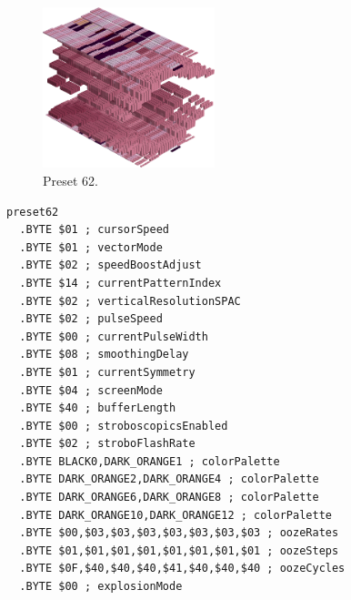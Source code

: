 \vspace*{-0.75cm}
\begin{minipage}[b]{0.48\linewidth}
\begin{figure}[H]                                                          
  \centering                                                             
  \begin{adjustbox}{width=5cm,center}                                   
  \includegraphics[width=5cm]{src/colorspace_presets/preset62-45.png}%
  \end{adjustbox}                                                        
\caption*{Preset 62.}                                           
\end{figure}                                                               
\end{minipage}
\hspace{0.1cm}
\begin{minipage}[b]{0.48\linewidth}                                                                         
\begin{lstlisting}[basicstyle=\ttfamily\tiny]
preset62
  .BYTE $01 ; cursorSpeed
  .BYTE $01 ; vectorMode
  .BYTE $02 ; speedBoostAdjust
  .BYTE $14 ; currentPatternIndex
  .BYTE $02 ; verticalResolutionSPAC
  .BYTE $02 ; pulseSpeed
  .BYTE $00 ; currentPulseWidth
  .BYTE $08 ; smoothingDelay
  .BYTE $01 ; currentSymmetry
  .BYTE $04 ; screenMode
  .BYTE $40 ; bufferLength
  .BYTE $00 ; stroboscopicsEnabled
  .BYTE $02 ; stroboFlashRate
  .BYTE BLACK0,DARK_ORANGE1 ; colorPalette
  .BYTE DARK_ORANGE2,DARK_ORANGE4 ; colorPalette
  .BYTE DARK_ORANGE6,DARK_ORANGE8 ; colorPalette
  .BYTE DARK_ORANGE10,DARK_ORANGE12 ; colorPalette
  .BYTE $00,$03,$03,$03,$03,$03,$03,$03 ; oozeRates
  .BYTE $01,$01,$01,$01,$01,$01,$01,$01 ; oozeSteps
  .BYTE $0F,$40,$40,$40,$41,$40,$40,$40 ; oozeCycles
  .BYTE $00 ; explosionMode
\end{lstlisting}
\end{minipage}



